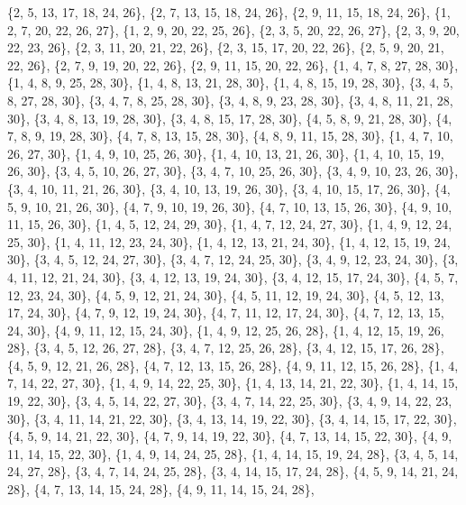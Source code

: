 \documentclass[11pt,a4paper]{article}
\begin{document}
{\{2, 5, 13, 17, 18, 24, 26\}, \{2, 7, 13, 15, 18, 24, 26\}, \{2, 9, 11, 15, 18, 24, 26\}, \{1, 2, 7, 20, 22, 26, 27\}, \{1, 2, 9, 20, 22, 25, 26\},
\{2, 3, 5, 20, 22, 26, 27\}, \{2, 3, 9, 20, 22, 23, 26\}, \{2, 3, 11, 20, 21, 22, 26\}, \{2, 3, 15, 17, 20, 22, 26\}, \{2, 5, 9, 20, 21, 22, 26\},
\{2, 7, 9, 19, 20, 22, 26\}, \{2, 9, 11, 15, 20, 22, 26\}, \{1, 4, 7, 8, 27, 28, 30\}, \{1, 4, 8, 9, 25, 28, 30\}, \{1, 4, 8, 13, 21, 28, 30\},
\{1, 4, 8, 15, 19, 28, 30\}, \{3, 4, 5, 8, 27, 28, 30\}, \{3, 4, 7, 8, 25, 28, 30\}, \{3, 4, 8, 9, 23, 28, 30\}, \{3, 4, 8, 11, 21, 28, 30\},
\{3, 4, 8, 13, 19, 28, 30\}, \{3, 4, 8, 15, 17, 28, 30\}, \{4, 5, 8, 9, 21, 28, 30\}, \{4, 7, 8, 9, 19, 28, 30\}, \{4, 7, 8, 13, 15, 28, 30\},
\{4, 8, 9, 11, 15, 28, 30\}, \{1, 4, 7, 10, 26, 27, 30\}, \{1, 4, 9, 10, 25, 26, 30\}, \{1, 4, 10, 13, 21, 26, 30\}, \{1, 4, 10, 15, 19, 26, 30\},
\{3, 4, 5, 10, 26, 27, 30\}, \{3, 4, 7, 10, 25, 26, 30\}, \{3, 4, 9, 10, 23, 26, 30\}, \{3, 4, 10, 11, 21, 26, 30\}, \{3, 4, 10, 13, 19, 26, 30\},
\{3, 4, 10, 15, 17, 26, 30\}, \{4, 5, 9, 10, 21, 26, 30\}, \{4, 7, 9, 10, 19, 26, 30\}, \{4, 7, 10, 13, 15, 26, 30\}, \{4, 9, 10, 11, 15, 26, 30\},
\{1, 4, 5, 12, 24, 29, 30\}, \{1, 4, 7, 12, 24, 27, 30\}, \{1, 4, 9, 12, 24, 25, 30\}, \{1, 4, 11, 12, 23, 24, 30\}, \{1, 4, 12, 13, 21, 24, 30\},
\{1, 4, 12, 15, 19, 24, 30\}, \{3, 4, 5, 12, 24, 27, 30\}, \{3, 4, 7, 12, 24, 25, 30\}, \{3, 4, 9, 12, 23, 24, 30\}, \{3, 4, 11, 12, 21, 24, 30\},
\{3, 4, 12, 13, 19, 24, 30\}, \{3, 4, 12, 15, 17, 24, 30\}, \{4, 5, 7, 12, 23, 24, 30\}, \{4, 5, 9, 12, 21, 24, 30\}, \{4, 5, 11, 12, 19, 24, 30\},
\{4, 5, 12, 13, 17, 24, 30\}, \{4, 7, 9, 12, 19, 24, 30\}, \{4, 7, 11, 12, 17, 24, 30\}, \{4, 7, 12, 13, 15, 24, 30\}, \{4, 9, 11, 12, 15, 24, 30\},
\{1, 4, 9, 12, 25, 26, 28\}, \{1, 4, 12, 15, 19, 26, 28\}, \{3, 4, 5, 12, 26, 27, 28\}, \{3, 4, 7, 12, 25, 26, 28\}, \{3, 4, 12, 15, 17, 26, 28\},
\{4, 5, 9, 12, 21, 26, 28\}, \{4, 7, 12, 13, 15, 26, 28\}, \{4, 9, 11, 12, 15, 26, 28\}, \{1, 4, 7, 14, 22, 27, 30\}, \{1, 4, 9, 14, 22, 25, 30\},
\{1, 4, 13, 14, 21, 22, 30\}, \{1, 4, 14, 15, 19, 22, 30\}, \{3, 4, 5, 14, 22, 27, 30\}, \{3, 4, 7, 14, 22, 25, 30\}, \{3, 4, 9, 14, 22, 23, 30\},
\{3, 4, 11, 14, 21, 22, 30\}, \{3, 4, 13, 14, 19, 22, 30\}, \{3, 4, 14, 15, 17, 22, 30\}, \{4, 5, 9, 14, 21, 22, 30\}, \{4, 7, 9, 14, 19, 22, 30\},
\{4, 7, 13, 14, 15, 22, 30\}, \{4, 9, 11, 14, 15, 22, 30\}, \{1, 4, 9, 14, 24, 25, 28\}, \{1, 4, 14, 15, 19, 24, 28\}, \{3, 4, 5, 14, 24, 27, 28\},
\{3, 4, 7, 14, 24, 25, 28\}, \{3, 4, 14, 15, 17, 24, 28\}, \{4, 5, 9, 14, 21, 24, 28\}, \{4, 7, 13, 14, 15, 24, 28\}, \{4, 9, 11, 14, 15, 24, 28\},
}
\end{document}
